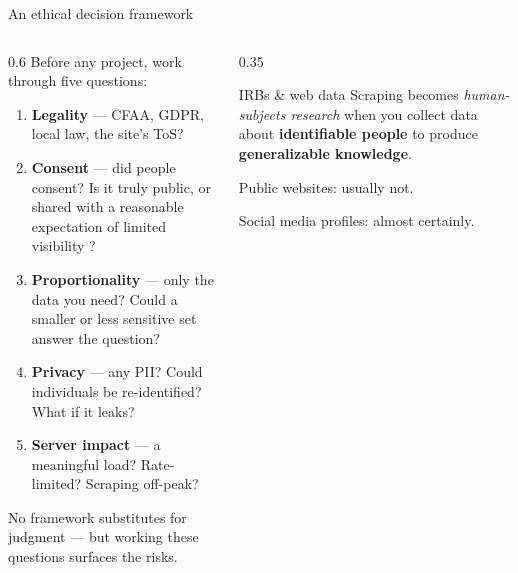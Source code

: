 \documentclass[9pt,aspectratio=169]{beamer}
\begin{document}
\begin{frame}{An ethical decision framework}
    \begin{columns}[T]
        \begin{column}{0.6\textwidth}
            Before any project, work through five questions:
            \begin{enumerate}\small
                \item \textbf{Legality} --- CFAA, GDPR, local law, the site's ToS?
                \item \textbf{Consent} --- did people consent? Is it truly public, or shared with a reasonable expectation of limited visibility \parencite{zimmer_DataAlreadyPublic_2010}?
                \item \textbf{Proportionality} --- only the data you need? Could a smaller or less sensitive set answer the question?
                \item \textbf{Privacy} --- any PII? Could individuals be re-identified? What if it leaks?
                \item \textbf{Server impact} --- a meaningful load? Rate-limited? Scraping off-peak?
            \end{enumerate}
            \smallskip
            {\footnotesize No framework substitutes for judgment --- but working these questions surfaces the risks.}
        \end{column}
        \begin{column}{0.35\textwidth}
            \begin{alertblock}{IRBs \& web data}
                \footnotesize Scraping becomes \textit{human-subjects research} when you collect data about \textbf{identifiable people} to produce \textbf{generalizable knowledge}. 
                
                \medskip
                Public websites: usually not. 
                
                \medskip
                Social media profiles: almost certainly.
            \end{alertblock}
        \end{column}
    \end{columns}
\end{frame}
\end{document}
